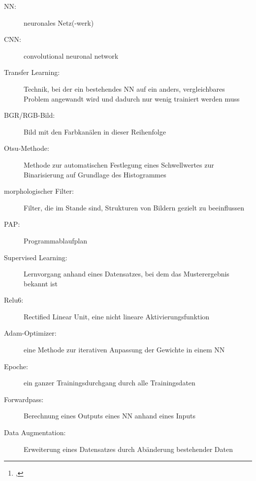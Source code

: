 \documentclass[12pt,toc=bib,toc=listof]{scrreprt}
\title{\reprttopic}
\author{\reprtstudentname\footnote{\reprtstudentid, \reprtstudentmail}}
\begin{document}
\renewcommand*{\figurename}{Abb.}
\maketitle
{}

\tableofcontents

\label{sec:abkuerzungsverzeichnis}
\noindent
\begin{description}

  \item[NN:]  neuronales Netz(-werk)
  \item[CNN:]  convolutional neuronal network
  \item[Transfer Learning:]  Technik, bei der ein bestehendes NN auf ein anders, vergleichbares Problem angewandt wird und dadurch nur wenig trainiert werden muss  
  \item[BGR/RGB-Bild:]  Bild mit den Farbkanälen in dieser Reihenfolge
  \item[Otsu-Methode:]  Methode zur automatischen Festlegung eines Schwellwertes zur Binarisierung auf Grundlage des Histogrammes
  \item[morphologischer Filter:]  Filter, die im Stande sind, Strukturen von Bildern gezielt zu beeinflussen \cite{digi_bv}
  \item[PAP: ]  Programmablaufplan
  \item[Supervised Learning: ] Lernvorgang anhand eines Datensatzes, bei dem das Musterergebnis bekannt ist
  \item[Relu6: ]  Rectified Linear Unit, eine nicht lineare Aktivierungsfunktion 
  \item[Adam-Optimizer:]  eine Methode zur iterativen Anpassung der Gewichte in einem NN
  \item[Epoche:]  ein ganzer Trainingsdurchgang durch alle Trainingsdaten 
  \item[Forwardpass:]  Berechnung eines Outputs eines NN anhand eines Inputs
  \item[Data Augmentation:]  Erweiterung eines Datensatzes durch Abänderung bestehender Daten
   
\end{description}


\onehalfspacing


\newpage
{}
\end{document}
